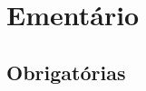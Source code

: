 \chapter{Ement\'{a}rio}
\label{apend:ementario}

\section{Obrigat\'{o}rias}
\label{apend:ementario:obrigatorias}


\newpage

\newpage

\newpage

\newpage

